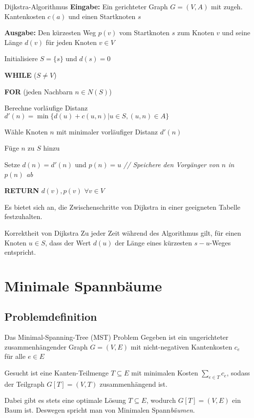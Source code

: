 \documentclass{panikzettel}
\newcommand\tab[1][1cm]{\hspace*{#1}}
\begin{document}
\begin{algo}{Dijkstra-Algorithmus }
	\textbf{Eingabe:} Ein gerichteter Graph $G = (V,A)$ mit zugeh. Kantenkosten $c(a)$ und einen Startknoten $s$
	
	\textbf{Ausgabe:} Den kürzesten Weg $p(v)$ vom Startknoten $s$ zum Knoten $v$ und seine Länge $d(v)$ für jeden Knoten $v \in V$
	
	\tcblower
	
	Initialisiere $S = \{s\}$ und $d(s) = 0$
	
	\textbf{WHILE} ($S \neq V$)
	
	\tab \textbf{FOR} (jeden Nachbarn $n \in N(S)$)
	
	\tab\tab Berechne vorläufige Distanz $d'(n) = \min \{d(u) + c(u,n) | u \in S, (u,n) \in A \}$
	
	\tab Wähle Knoten $n$ mit minimaler vorläufiger Distanz $d'(n)$
	
	\tab Füge $n$ zu $S$ hinzu
	
	\tab Setze $d(n) = d'(n)$ und $p(n) = u$ \textit{ \color{gray} // Speichere den Vorgänger von $n$ in $p(n)$ ab }
	
	\textbf{RETURN} $d(v), p(v)$ $\forall v \in V$
\end{algo}

Es bietet sich an, die Zwischenschritte von Dijkstra in einer geeigneten Tabelle festzuhalten.

\begin{theo}{Korrektheit von Dijkstra}
	Zu jeder Zeit während des Algorithmus gilt, für einen Knoten $u \in S$, dass der Wert $d(u)$ der Länge eines kürzesten $s-u$-Weges entspricht.	
\end{theo}

\newpage
\section{Minimale Spannbäume}

\subsection{Problemdefinition}

\begin{defi}{Das Minimal-Spanning-Tree (MST) Problem}
	Gegeben ist ein ungerichteter zusammenhängender Graph $G= (V,E)$ mit nicht-negativen Kantenkosten $c_e$ für alle $e \in E$
	
	Gesucht ist eine Kanten-Teilmenge $T \subseteq E$ mit minimalen Kosten $\sum_{e \in T} c_e$, sodass der Teilgraph $G[T] = (V,T)$ zusammenhängend ist. 
	
	Dabei gibt es stets eine optimale Lösung $T \subseteq E$, wodurch $G[T] = (V,E)$ ein Baum ist. Deswegen spricht man von Minimalen Spann\emph{bäumen}.
\end{defi}
\end{document}
